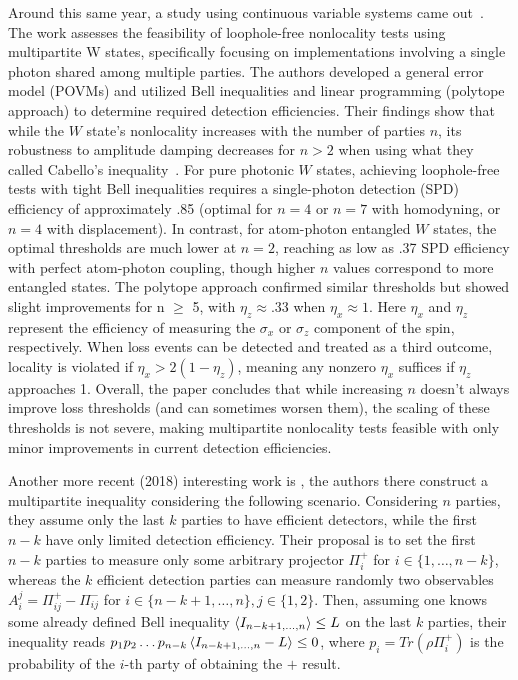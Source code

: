 \documentclass[aps,pra,reprint, superscriptaddress,showkeys]{revtex4-2}
\theoremstyle{plain}
\begin{document}
Around this same year, a study using continuous variable systems came out~\cite{Chaves_Brask_2011}. The work assesses the feasibility of loophole-free nonlocality tests using multipartite W states, specifically focusing on implementations involving a single photon shared among multiple parties. The authors developed a general error model (POVMs) and utilized Bell inequalities and linear programming (polytope approach) to determine required detection efficiencies.
Their findings show that while the $W$ state's nonlocality increases with the number of parties $n$,  its robustness to amplitude damping decreases for $n> 2$ when using what they called Cabello's inequality~\cite{Cabello_inequality}.  For pure photonic $W$ states, achieving loophole-free tests with tight Bell inequalities requires a single-photon detection (SPD) efficiency of approximately .85 (optimal for $n=4$ or $n=7$ with homodyning, or $n=4$ with displacement). In contrast, for atom-photon entangled $W$ states, the optimal thresholds are much lower at $n=2$, reaching as low as .37 SPD efficiency with perfect atom-photon coupling, though higher $n$ values correspond to more entangled states. The polytope approach confirmed similar thresholds but showed slight improvements for n $\ge$ 5, with $\eta_z \approx .33$ when $\eta_x \approx 1$. Here $\eta_x$ and $\eta_z$ represent the efficiency of measuring the $\sigma_x$ or $\sigma_z$ component of the spin, respectively. When loss events can be detected and treated as a third outcome, locality is violated if $\eta_x > 2(1 - \eta_z)$, meaning any nonzero $\eta_x$ suffices if $\eta_z$ approaches 1. Overall, the paper concludes that while increasing $n$ doesn't always improve loss thresholds (and can sometimes worsen them), the scaling of these thresholds is not severe, making multipartite nonlocality tests feasible with only minor improvements in current detection efficiencies.


Another more recent (2018) interesting work is \cite{Polonia_Tamas_Multipartite}, the authors there construct a multipartite inequality considering the following scenario. Considering $n$ parties, they assume only the last $k$ parties to have efficient detectors, while the first $n-k$ have only limited detection efficiency. Their proposal is to set the first $n-k$ parties to measure only some arbitrary projector $\Pi_i^+$ for $i\in\{1,\dots ,n-k\}$, whereas the  $k$ efficient detection parties can measure randomly two observables $A^j_i = \Pi_{ij}^+ -  \Pi_{ij}^- $ for $i\in\{n-k+1,\dots ,n\}, j\in\{1,2\}$.  Then, assuming one knows some already defined Bell inequality $\braket{I_{n-k+1,\dots ,n}}\leq L$ on the last $k$ parties, their inequality reads
$p_1p_2\dots p_{n-k}\braket{I_{n-k+1,\dots ,n}-L}\leq 0$,
 where $p_i = Tr(\rho\Pi^+_i)$ is the probability of the $i$-th party of obtaining the $+$ result. 
\end{document}
